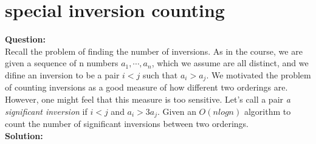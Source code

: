 \section{special inversion counting}
\textbf{Question:} \\
Recall the problem of finding the number of inversions. As in the course, we are given a
sequence of n numbers $a_1,\cdots,a_n$, which we assume are all distinct, and we difine an inversion
to be a pair $i < j$ such that $a_i > a_j$.
We motivated the problem of counting inversions as a good measure of how different two
orderings are. However, one might feel that this measure is too sensitive. Let’s call a pair \textit{a significant inversion} if $i < j$ and $a_i > 3a_j$. Given an $O(nlogn)$ algorithm to count the number of significant inversions between two orderings. \\
\textbf{Solution:} 

